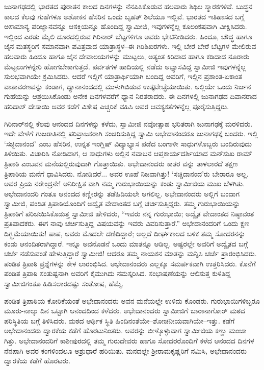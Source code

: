 ಜುನಾಗಢದಲ್ಲಿ ಭಾರತದ ಪುರಾತನ ಕಾಲದ ದಿನಗಳನ್ನು ನೆನಪಿಸಿಕೊಡುವ ಹಲವಾರು ಶಿಥಿಲ ಸ್ಮಾರಕಗಳಿವೆ. ಬುದ್ಧನ ಕಾಲದ ಕೆಲವು ಗುಹೆಗಳೂ ಅಶೋಕನ ಹೆಸರಿನ ಒಂದು ಬೃಹತ್ ಶಿಲೆಯೂ ಇಲ್ಲಿವೆ. ಭಾರತದ ಇತಿಹಾಸದ ಬಗ್ಗೆ ಅಸಾಮಾನ್ಯ ಪರಿಜ್ಞಾನವನ್ನೂ ಆಸಕ್ತಿಯನ್ನೂ ಹೊಂದಿದ್ದ ಸ್ವಾಮೀಜಿ, ಇವುಗಳನ್ನೆಲ್ಲ ಕೂಲಂಕಷವಾಗಿ ವೀಕ್ಷಿಸಿದರು. ಇಲ್ಲಿಂದ ಎರಡು ಮೈಲಿ ದೂರದಲ್ಲಿರುವ ಗಿರಿನಾರ್ ಬೆಟ್ಟಗಳಿಗೂ ಅವರು ಭೇಟಿನೀಡಿದರು. ಹಿಂದೂ, ಬೌದ್ಧ ಹಾಗೂ ಜೈನ ಮತಸ್ಥರಿಗೆ ಸಮಾನವಾಗಿ ಪವಿತ್ರವಾದ ಯಾತ್ರಾಸ್ಥಳ–ಈ ಗಿರಿಶಿಖರಗಳು. ಇಲ್ಲಿ ಬೇರೆ ಬೇರೆ ಬೆಟ್ಟಗಳ ಮೇಲಿರುವ ಹಲವಾರು ಹಿಂದೂ ಹಾಗೂ ಜೈನ ದೇವಾಲಯಗಳನ್ನು ಮುಟ್ಟಲು, ಅತ್ಯಂತ ಕಿರಿದಾದ ಹಾಗೂ ಕಡಿದಾದ ನೂರಾರು ಮೆಟ್ಟಲುಗಳನ್ನೇರಿ ಹೋಗಬೇಕಾಗುತ್ತದೆ. ಪರ್ವತಗಳ ಹಾದಿಯಲ್ಲಿ ನಡೆದು ಅಭ್ಯಾಸವಿದ್ದ ಸ್ವಾಮೀಜಿ ಇವುಗಳನ್ನೆಲ್ಲ ಸುಲಭವಾಗಿಯೇ ಕ್ರಮಿಸಿದರು. ಆದರೆ ಇಲ್ಲಿಗೆ ಯಾತ್ರಾರ್ಥಿಯಾಗಿ ಬಂದಿದ್ದ ಅವರಿಗೆ, ಇಲ್ಲಿನ ಪ್ರಶಾಂತ-ಏಕಾಂತ ವಾತಾವರಣವನ್ನು ಕಂಡಾಗ, ಧ್ಯಾನಾನಂದದಲ್ಲಿ ಮುಳುಗಿಬಿಡುವ ಉತ್ಕಟೇಚ್ಛೆಯಾಯಿತು. ಅಲ್ಲಿಯೇ ಒಂದು ನಿರ್ಜನ ಗುಹೆಯನ್ನು ಆಶ್ರಯಿಸಿಕೊಂಡು ಅನೇಕ ದಿನಗಳವರೆಗೆ ಧ್ಯಾನ ನಿರತರಾದರು. ಈ ದಿನಗಳಲ್ಲಿ ಜುನಾಗಢದ ದಿವಾನರಾದ ಹರಿದಾಸ್ ದೇಸಾಯಿ ಅವರ ಕಡೆಗೆ ವಿಶೇಷ ಎಚ್ಚರಿಕೆ ವಹಿಸಿ ಅವರ ಆವಶ್ಯಕತೆಗಳನ್ನೆಲ್ಲ ಪೂರೈಸುತ್ತಿದ್ದರು.

ಗಿರಿನಾರ್​ನಲ್ಲಿ ಕೆಲವು ಆನಂದದ ದಿನಗಳನ್ನು ಕಳೆದು, ಸ್ವಾಮೀಜಿ ನವೋತ್ಸಾಹ ಭರಿತರಾಗಿ ಜುನಾಗಢಕ್ಕೆ ಮರಳಿದರು. ಇದೇ ವೇಳೆಗೆ ಗುಜರಾತಿನಲ್ಲಿ ಪರಿವ್ರಾಜಕರಾಗಿ ಸಂಚರಿಸುತ್ತಿದ್ದ ಸ್ವಾಮಿ ಅಭೇದಾನಂದರೂ ಜುನಾಗಢಕ್ಕೆ ಬಂದರು. ಇಲ್ಲಿ ‘ಸಚ್ಛಿದಾನಂದ’ ಎಂಬ ಹೆಸರಿನ, ಉನ್ನತ ಇಂಗ್ಲಿಷ್ ವಿದ್ಯಾಭ್ಯಾಸ ಪಡೆದ ಬಂಗಾಳೀ ಸಾಧುಗಳೊಬ್ಬರು ಬಂದಿರುವುದು ತಿಳಿಯಿತು. ವಿಚಾರಿಸಿ ನೋಡಿದಾಗ, ಆ ಸಾಧುಗಳು ಅಲ್ಲಿನ ನವಾಬನ ಆಪ್ತಕಾರ್ಯದರ್ಶಿಯಾದ ಮನ್​ಸುಖ ರಾಮ್ ತ್ರಿಪಾಠಿ ಎಂಬವನ ಮನೆಯಲ್ಲಿರುವುದಾಗಿ ಗೊತ್ತಾಯಿತು. ಅಭೇದಾನಂದರು ಕಾತರ ವನ್ನು ತಾಳಲಾರದೆ ತಕ್ಷಣ ತ್ರಿಪಾಠಿಯ ಮನೆಗೆ ಧಾವಿಸಿದರು. ನೋಡಿದರೆ... ಅವರ ಊಹೆ ನಿಜವಾಗಿತ್ತು! ‘ಸಚ್ಚಿದಾನಂದ’ರು ಬೇರಾರೂ ಅಲ್ಲ. ಅವರ ಪ್ರಿಯ ನರೇಂದ್ರನೇ! ಅನಿರೀಕ್ಷಿತ ವಾಗಿ ನಮ್ಮ ಗುರುಭಾಯಿಯನ್ನು ಕಂಡು ಸ್ವಾಮೀಜಿಯ ಮುಖ ಬೆಳಗಿತು. ಅಭೇದಾನಂದರಿ ಗಂತೂ ಆನಂದದ ಕಣ್ಣೀರನ್ನು ತಡೆಹಿಡಿಯಲೇ ಆಗಲಿಲ್ಲ. ಅಭೇದಾನಂದರು ಅಲ್ಲಿಗೆ ಬಂದಾಗ ಸ್ವಾಮೀಜಿ, ಪಂಡಿತ ತ್ರಿಪಾಠಿಯೊಂದಿಗೆ ಅದ್ವೈತ ವೇದಾಂತದ ಬಗ್ಗೆ ಚರ್ಚಿಸುತ್ತಿದ್ದರು. ತಮ್ಮ ಗುರುಭಾಯಿಯನ್ನು ತ್ರಿಪಾಠಿಗೆ ಪರಿಚಯಿಸಿಕೊಡುತ್ತ ಸ್ವಾಮೀಜಿ ಹೇಳಿದರು, “ಇವರು ನನ್ನ ಗುರುಭಾಯಿ; ಅದ್ವೈತ ವೇದಾಂತದ ನಿಷ್ಠಾವಂತ ಪ್ರತಿಪಾದಕರು. ಈಗ ನಾವು ಚರ್ಚಿಸುತ್ತಿದ್ದ ವಿಷಯವನ್ನು ಇವರು ವಿವರಿಸುತ್ತಾರೆ.” ಅಭೇದಾನಂದರಿಗೆ ಒಂದು ಕ್ಷಣ ದಿಗ್ಭ್ರಮೆಯಾಯಿತು! ಪಾಪ, ಅವರು ಮೊದಲೇ ದಣಿದಿದ್ದಾರೆ; ಅಲ್ಲದೆ ದೀರ್ಘಕಾಲದ ಬಳಿಕ ತಮ್ಮ ಸೋದರನನ್ನು ಕಂಡು ಆನಂದಿತರಾಗಿದ್ದಾರೆ. ಇನ್ನೂ ಅವನೊಡನೆ ಒಂದು ಮಾತನ್ನೂ ಆಡಿಲ್ಲ. ಅಷ್ಟರಲ್ಲೇ ಅವರಿಗೆ ಅದ್ವೈತದ ಬಗ್ಗೆ ಚರ್ಚೆ ನಡೆಸುವಂತೆ ಹೇಳುತ್ತಿದ್ದಾರೆ ಸ್ವಾಮೀಜಿ! ಆದರೂ ತಮ್ಮ ನಾಯಕನ ಮಾತನ್ನು ಮನ್ನಿಸಿ ಚರ್ಚೆ ಪ್ರಾರಂಭಿಸಿದರು. ಪಂಡಿತ ತ್ರಿಪಾಠಿ ಪ್ರಶ್ನೆಗಳನ್ನು ಕೇಳ ಲಾರಂಭಿಸಿದ. ಅಭೇದಾನಂದರು ಎಲ್ಲಕ್ಕೂ ಸಮರ್ಪಕವಾಗಿ ಉತ್ತರಿಸಿದರು. ಕೊನೆಗೆ ಪಂಡಿತ ತ್ರಿಪಾಠಿ ಸಂತುಷ್ಟನಾಗಿ ಅವರಿಗೆ ಕೈಮುಗಿದು ನಮಸ್ಕರಿಸಿದ. ಸಂಭಾಷಣೆಯನ್ನು ಆಲಿಸುತ್ತ ಕುಳಿತಿದ್ದ ಸ್ವಾಮೀಜಿಗಂತೂ ಹಿಡಿಸಲಾರದಷ್ಟು ಸಂತೋಷ, ಹೆಮ್ಮೆ.

ಪಂಡಿತ ತ್ರಿಪಾಠಿಯ ಕೋರಿಕೆಯಂತೆ ಅಭೇದಾನಂದರು ಅವನ ಮನೆಯಲ್ಲೇ ಉಳಿದು ಕೊಂಡರು. ಗುರುಭಾಯಿಗಳಿಬ್ಬರೂ ಮೂರು-ನಾಲ್ಕು ದಿನ ಒಟ್ಟಾಗಿ ಆನಂದದಿಂದ ಕಳೆದರು. ಅಭೇದಾನಂದರು ಸ್ವಾಮೀಜಿಗೆ ಬಾರಾನಾಗೋರ್ ಮಠದ ಪರಿಸ್ಥಿತಿಯ ಬಗ್ಗೆ ತಿಳಿಸಿದರು. ಮಠದ ಆರ್ಥಿಕ ಸ್ಥಿತಿ ಹಿಂದಿನಂತೆಯೇ–ಶೋಚನೀಯವಾಗಿಯೇ–ಇತ್ತು. ಕಡೆಗೆ ಅಭೇದಾನಂದರು ದ್ವಾರಕೆಯ ಕಡೆಗೆ ಹೊರಟುನಿಂತರು. ಅವರನ್ನು ಬೀಳ್ಕೊಳ್ಳುವಾಗ ಸ್ವಾಮೀಜಿಯ ಕಣ್ಣು ಮಂಜಾ ಗಿತ್ತು. ಅಭೇದಾನಂದರಿಗೆ ಕಾಶೀಪುರದಲ್ಲಿ ತಮ್ಮ ಗುರುದೇವರು ಹಾಗೂ ಸೋದರರೊಂದಿಗೆ ಕಳೆದ ಆನಂದದ ದಿನಗಳ ನೆನಪಾಗಿ ಅವರ ಕಂಗಳಿಂದಲೂ ಅಶ್ರುಧಾರೆ ಹರಿಯಿತು. ಮನದಲ್ಲೇ ಶ್ರೀರಾಮಕೃಷ್ಣರಿಗೆ ನಮಿಸಿ, ಅಭೇದಾನಂದರು ದ್ವಾರಕೆಯ ಕಡೆಗೆ ಹೊರಟರು.

